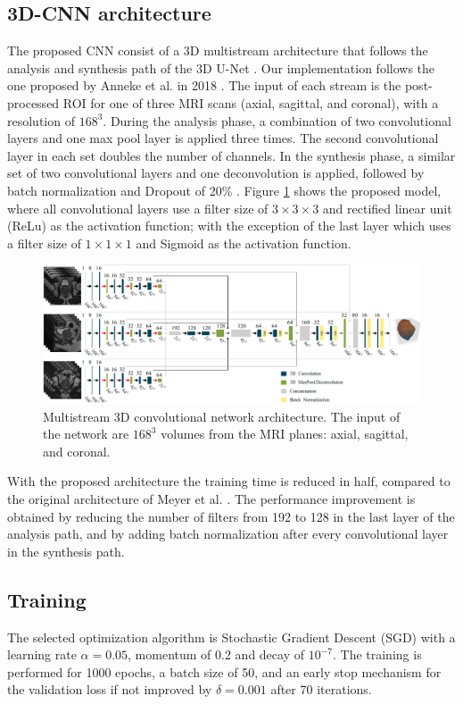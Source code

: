\subsection{3D-CNN architecture}
The proposed CNN consist of a 3D multistream architecture that follows the analysis
and synthesis path of the 3D U-Net \cite{cciccek20163d}. Our implementation
follows the one proposed by Anneke et al. in 2018  \cite{anneke}. The input of each stream is
the post-processed ROI for one of three MRI scans (axial, sagittal, and coronal),
with a resolution of $168^3$. During the analysis phase, a combination
of two convolutional layers and one max pool layer is applied three times. The second 
convolutional layer in each set doubles the number of channels. 
In the synthesis phase, a similar set of two convolutional layers and
one deconvolution is applied, followed by batch normalization and Dropout of
20\% \cite{hinton2012improving}.
Figure \ref{fig:nn} shows the proposed model, where 
all convolutional layers use a filter size of $3 \times 3 \times 3$ and
rectified linear unit (ReLu) as the activation function; with the exception
of the last layer which uses a filter size of $1 \times 1 \times 1$  and Sigmoid
as the activation function. 
\begin{figure}[h]
    \centering
    \includegraphics[totalheight=.275\textheight]{imgs/methodology/NN.png}
    \caption{Multistream 3D convolutional network architecture. The input of the network
    are $168^3$ volumes from the MRI planes: axial, sagittal, and coronal. }
    \label{fig:nn}
\end{figure}

With the proposed architecture the training time is reduced in half, compared
to the original architecture of Meyer et al. \cite{anneke}. The performance
improvement is obtained by reducing the number of filters 
from 192 to 128 in the last layer of the analysis path, and
by adding batch normalization after every convolutional layer 
in the synthesis path.

\subsection{Training}
\label{subsec:training}
The selected optimization algorithm is Stochastic Gradient Descent (SGD) with a
learning rate $\alpha = 0.05$, momentum of 0.2 and decay of $10^{-7}$. The training is performed
for 1000 epochs, a batch size of 50, and an early stop mechanism for the validation
loss if not improved by $\delta = 0.001$ after 70 iterations. 

